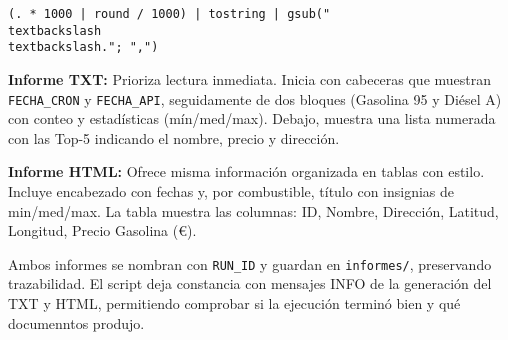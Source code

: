 \texttt{(. * 1000 | round / 1000) | tostring | gsub("\\textbackslash\\textbackslash."; ",")}

\textbf{Informe TXT:} Prioriza lectura inmediata. Inicia con cabeceras que muestran \\
\texttt{FECHA\_CRON} y \texttt{FECHA\_API}, seguidamente de dos bloques (Gasolina 95 y Diésel A) con conteo y estadísticas (mín/med/max). Debajo, muestra una lista numerada con las Top-5 indicando el nombre, precio y dirección.

\textbf{Informe HTML:} Ofrece misma información organizada en tablas con estilo. Incluye encabezado con fechas y, por combustible, título con insignias de min/med/max. La tabla muestra las columnas: ID, Nombre, Dirección, Latitud, Longitud, Precio Gasolina (€).

Ambos informes se nombran con \texttt{RUN\_ID} y guardan en \texttt{informes/}, preservando trazabilidad. El script deja constancia con mensajes INFO de la generación del TXT y HTML, permitiendo comprobar si la ejecución terminó bien y qué documenntos produjo.
